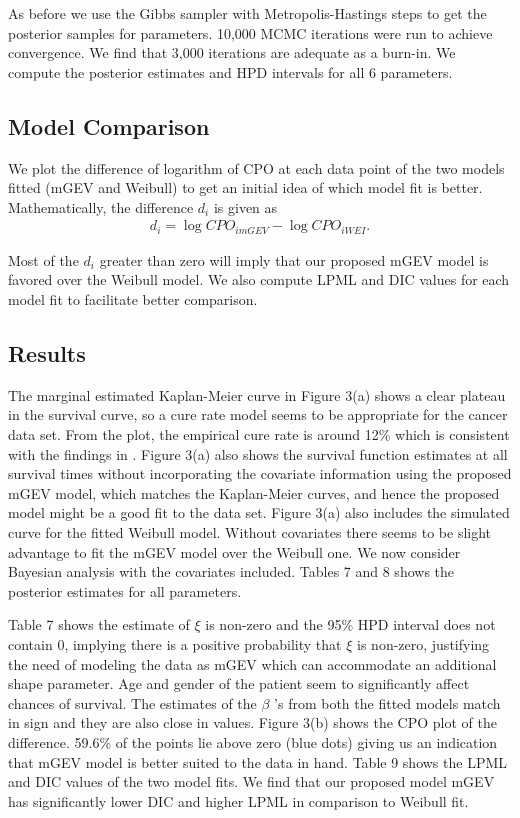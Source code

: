 \documentclass[smallextended]{svjour3}       %
\begin{document}
{As before we use the Gibbs sampler with Metropolis-Hastings steps to get the posterior samples for parameters. 10,000 MCMC iterations were run to achieve convergence. We find that 3,000 iterations are adequate as a burn-in. We compute the posterior
estimates and HPD intervals for all 6 parameters. 

\subsection{Model Comparison}
We plot the difference of logarithm of CPO at each data point of the two models fitted (mGEV and Weibull) to get an initial idea of which model fit is better. Mathematically, the difference $d_i$ is given as
\begin{eqnarray}
d_i = \log CPO_{imGEV} - \log CPO_{iWEI}.
\end{eqnarray}


Most of the $d_i$ greater than zero will imply that our proposed mGEV model is favored over the Weibull model. We also compute LPML and DIC values for each model fit to facilitate better comparison.

\subsection{Results}

The marginal estimated Kaplan-Meier curve in Figure 3(a) shows a clear plateau in the survival
curve, so a cure rate model seems to be appropriate for the cancer data set. From the plot, the empirical cure rate is around 12\% which is consistent with the findings in \citet{smoll:2012}. Figure 3(a) also shows the survival function estimates at all survival times without incorporating the covariate information using the proposed mGEV model, which matches the Kaplan-Meier curves, and hence the proposed model might be a good fit to the data set. Figure 3(a) also includes the simulated curve for the fitted Weibull model. Without covariates there seems to be slight advantage to fit the mGEV model over the Weibull one. We now consider Bayesian analysis with the covariates included. Tables 7 and 8 shows the posterior estimates for all parameters.

Table 7 shows the estimate of $\xi$ is non-zero and the 95\% HPD interval does not contain 0, implying there is a positive probability that $\xi$ is non-zero, justifying the need of modeling the data as mGEV which can accommodate an additional shape parameter. Age and gender of the patient seem to significantly affect chances of survival. The estimates of the $\beta$ 's from both the fitted models match in sign and they are also close in values. Figure 3(b) shows the CPO plot of the difference. 59.6\% of the points lie above zero (blue dots) giving us an indication that mGEV model is better suited to the data in hand. Table 9 shows the LPML and DIC values of the two model fits. We find that our proposed model mGEV has significantly lower DIC and higher LPML in comparison to Weibull fit.


}
\end{document}
